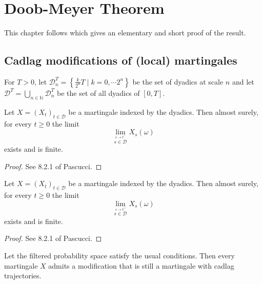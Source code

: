 \chapter{Doob-Meyer Theorem}
\label{chap:doob_meyer}


This chapter follows \cite{Beiglböck_Schachermayer_Veliyev_2012}
which gives an elementary and short proof of the result.



\section{Cadlag modifications of (local) martingales}



\begin{definition}[Dyadics]\label{def:dyadics}
For $T>0$, let $\mathcal{D}_n^T = \left\lbrace \frac{k}{2^n}T \mid k=0,\cdots 2^n\right\rbrace$ be the set of dyadics at scale $n$ and let $\mathcal{D}^T=\bigcup_{n\in\mathbb{N}}\mathcal{D}_n^T$ be the set of all dyadics of $[0,T]$.
\end{definition}


\begin{lemma}\label{lem:martingale_exists_dyadic_limit_left}
  Let $X=(X_t)_{t\in\mathcal{D}}$ be a martingale indexed by the dyadics. Then almost surely, for every $t\geq 0$ the limit
  $$
  \lim_{\stackrel{s\rightarrow t^-}{s\in\mathcal{D}}}X_s(\omega)
  $$
  exists and is finite.
\end{lemma}

\begin{proof}
  See 8.2.1 of Pascucci.
\end{proof}


\begin{lemma}\label{lem:martingale_exists_dyadic_limit_right}
  Let $X=(X_t)_{t\in\mathcal{D}}$ be a martingale indexed by the dyadics. Then almost surely, for every $t\geq 0$ the limit
  $$
  \lim_{\stackrel{s\rightarrow t^+}{s\in\mathcal{D}}}X_s(\omega)
  $$
  exists and is finite.
\end{lemma}

\begin{proof}
  See 8.2.1 of Pascucci.
\end{proof}


\begin{lemma}\label{lem:mg_is_cadlag}
  Let the filtered probability space satisfy the usual conditions.
  Then every martingale $X$ admits a modification that is still a martingale with cadlag trajectories.
\end{lemma}

